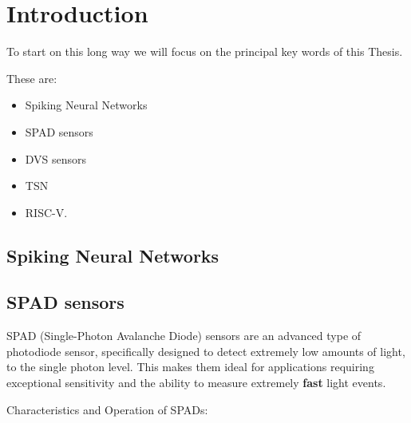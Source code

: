 \section{Introduction}

\label{intro}

To start on this long way we will focus on the principal key words of this Thesis.

\vspace{5 mm}

\noindent These are: 

\begin{itemize}
\item Spiking Neural Networks
\item SPAD sensors
\item DVS sensors
\item TSN
\item RISC-V.
\end{itemize}

\subsection{Spiking Neural Networks}

\subsection{SPAD sensors}

SPAD (Single-Photon Avalanche Diode) \cite{9031298} sensors are an advanced type of photodiode sensor, specifically designed to detect extremely low amounts of light, to the single photon level. 
This makes them ideal for applications requiring exceptional sensitivity and the ability to measure extremely \textbf{fast} light events.

\vspace{5 mm}

\noindent Characteristics and Operation of SPADs:

